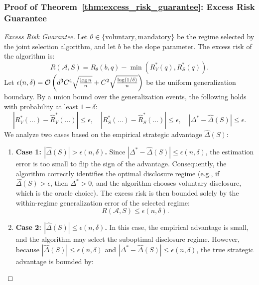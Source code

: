\subsubsection*{Proof of Theorem~\ref{thm:excess_risk_guarantee}: Excess Risk Guarantee}
\label{app:proof_excess_risk_guarantee}
\begin{proof}[Excess Risk Guarantee]
Let $\theta \in \{\mathrm{voluntary}, \mathrm{mandatory}\}$ be the regime selected by the joint selection algorithm, and let $b$ be the slope parameter. The excess risk of the algorithm is:
\begin{equation}
    R(\mathcal{A}, S) = R_\theta(b, q) - \min(R_V^*(q), R_S^*(q)).
\end{equation}
Let $\epsilon(n, \delta) = \mathcal{O}\left( d^3 C^4 \sqrt{\frac{\log n}{n}} + C^2 \sqrt{\frac{\log(1/\delta)}{n}} \right)$ be the uniform generalization boundary. By a union bound over the generalization events, the following holds with probability at least $1 - \delta$:
\begin{equation}
    \label{eq:gen_bounds_simult}
    |R_V^*(\dots) - \hat{R}_V^*(\dots)| \le \epsilon, \quad |R_S^*(\dots) - \hat{R}_S^*(\dots)| \le \epsilon, \quad |\Delta^* - \hat{\Delta}(S)| \le \epsilon.
\end{equation}
We analyze two cases based on the empirical strategic advantage $\hat{\Delta}(S)$:
\begin{enumerate}
    \item \textbf{Case 1: $|\hat{\Delta}(S)| > \epsilon(n, \delta)$.} 
    Since $|\Delta^* - \hat{\Delta}(S)| \le \epsilon(n, \delta)$, the estimation error is too small to flip the sign of the advantage. Consequently, the algorithm correctly identifies the optimal disclosure regime (e.g., if $\hat{\Delta}(S) > \epsilon$, then $\Delta^* > 0$, and the algorithm chooses voluntary disclosure, which is the oracle choice). The excess risk is then bounded solely by the within-regime generalization error of the selected regime:
    \begin{equation}
        R(\mathcal{A}, S) \le \epsilon(n, \delta).
    \end{equation}
    \item \textbf{Case 2: $|\hat{\Delta}(S)| \le \epsilon(n, \delta)$.}
    In this case, the empirical advantage is small, and the algorithm may select the suboptimal disclosure regime. However, because $|\hat{\Delta}(S)| \le \epsilon(n, \delta)$ and $|\Delta^* - \hat{\Delta}(S)| \le \epsilon(n, \delta)$, the true strategic advantage is bounded by:
    \begin{equation}

\end{equation}
\end{enumerate}
\end{proof}
